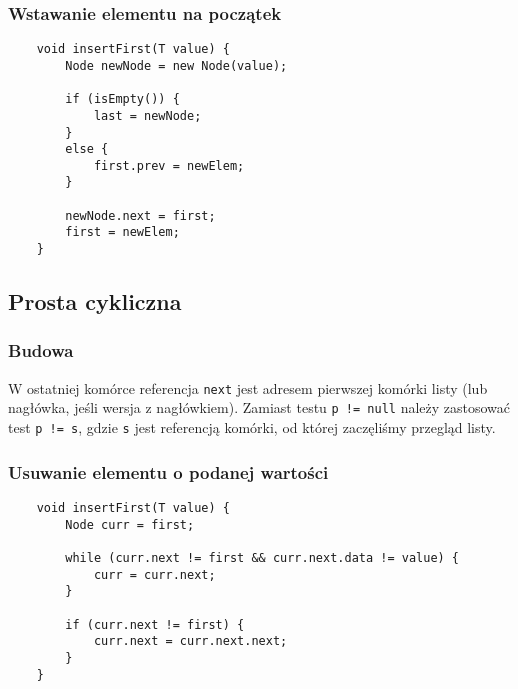 \documentclass[../algorytmy.tex]{subfiles}
\begin{document}
    \subsubsection{Wstawanie elementu na początek}
    \begin{verbatim}
    void insertFirst(T value) {
        Node newNode = new Node(value);

        if (isEmpty()) {
            last = newNode;
        }
        else {
            first.prev = newElem;
        }

        newNode.next = first;
        first = newElem;
    }
    \end{verbatim}


    \subsection{Prosta cykliczna}
    \subsubsection{Budowa}
    W ostatniej komórce referencja \texttt{next} jest  adresem  pierwszej
    komórki listy (lub nagłówka, jeśli wersja z nagłówkiem).
    Zamiast testu \texttt{p != null} należy zastosować test \texttt{p != s},
    gdzie \texttt{s} jest referencją komórki, od której zaczęliśmy przegląd
    listy.

    \subsubsection{Usuwanie elementu o podanej wartości}
    \begin{verbatim}
    void insertFirst(T value) {
        Node curr = first;

        while (curr.next != first && curr.next.data != value) {
            curr = curr.next;
        }

        if (curr.next != first) {
            curr.next = curr.next.next;
        }
    }
    \end{verbatim}

\end{document}
